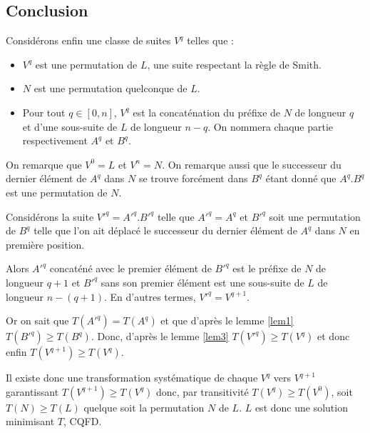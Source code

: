 \subsection{Conclusion}
Considérons enfin une classe de suites $V^q$ telles que :
\begin{itemize}
\item $V^q$ est une permutation de $L$, une suite respectant la règle de Smith.
\item $N$ est une permutation quelconque de $L$.
\item Pour tout $q\in[0,n]$, $V^q$ est la concaténation du préfixe de $N$ de 
longueur $q$ et d'une sous-suite de $L$ de longueur $n-q$. On nommera chaque 
partie respectivement $A^q$ et $B^q$.
\end{itemize}
On remarque que $V^0=L$ et $V^n=N$. On remarque aussi que le successeur du 
dernier élément de $A^q$ dans $N$ se trouve forcément dans $B^q$ étant donné que 
$A^q.B^q$ est une permutation de $N$.

Considérons la suite $V'^q=A'^q.B'^q$ telle que $A'^q=A^q$ et $B'^q$ soit une 
permutation de $B^q$ telle que l'on ait déplacé le successeur du dernier élément 
de $A^q$ dans $N$ en première position.

Alors $A'^q$ concaténé avec le premier élément de $B'^q$ est le préfixe de $N$ 
de longueur $q+1$ et $B'^q$ sans son premier élément est une sous-suite de $L$ 
de longueur $n-(q+1)$. En d'autres termes, $V'^q=V^{q+1}$.

Or on sait que $T(A'^q)=T(A^q)$ et que d'après le lemme \ref{lem1} $T(B'^q)\geq 
T(B^q)$.  Donc, d'après le lemme \ref{lem3} $T(V'^q)\geq T(V^q)$ et donc enfin 
$T(V^{q+1}) \geq T(V^q)$.

Il existe donc une transformation systématique de chaque $V^q$ vers $V^{q+1}$ 
garantissant $T(V^{q+1}) \geq T(V^q)$ donc, par transitivité $T(V^q) \geq 
T(V^0)$, soit $T(N) \geq T(L)$ quelque soit la permutation $N$ de $L$. $L$ est 
donc une solution minimisant $T$, CQFD.
